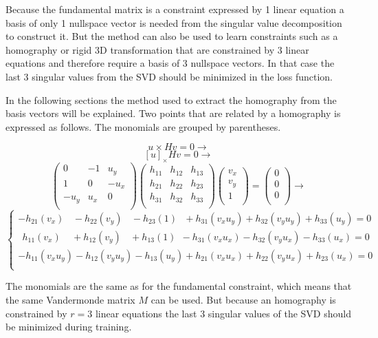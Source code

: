 Because the fundamental matrix is a constraint expressed by 1 linear equation a basis of only 1  nullspace vector is needed from the singular value decomposition to construct it. But the method can also be used to learn constraints such as a homography or rigid 3D transformation that are constrained by 3 linear equations and therefore require a basis of 3 nullspace vectors. In that case the last 3 singular values from the SVD should be minimized in the loss function.

In the following sections the method used to extract the homography from the basis vectors will be explained. Two points that are related by a homography is expressed as follows. The monomials are grouped by parentheses.

\[
u \times Hv=0 \rightarrow
\]
\[
[u]_{\times} Hv=0 \rightarrow
\]
\[
\begin{pmatrix}
0 & -1 & u_y \\
1 & 0 & -u_x \\
-u_y & u_x & 0 \\
\end{pmatrix}
\begin{pmatrix}
h_{11} & h_{12} & h_{13} \\
h_{21} & h_{22} & h_{23} \\
h_{31} & h_{32} & h_{33} \\
\end{pmatrix}
\begin{pmatrix}
v_x \\
v_y \\
1 \\
\end{pmatrix}
=
\begin{pmatrix}
0 \\
0 \\
0 \\
\end{pmatrix}
\rightarrow
\]
\[
\begin{cases}
-h_{21} (v_x) \ \ \ \ - h_{22} (v_y) \ \ \ \ - h_{23} (1) \ \ \ + h_{31} (v_x u_y) + h_{32} (v_y u_y) + h_{33} (u_y) = 0 \\
\ \ h_{11} (v_x) \ \ \ \ \ + h_{12} (v_y) \ \ \ \ + h_{13} (1) \ \ -h_{31} (v_x u_x) -h_{32} (v_y u_x) - h_{33} (u_x) = 0 \\
-h_{11} (v_x u_y) -h_{12} (v_y u_y) -h_{13} (u_y) + h_{21} (v_x u_x) + h_{22} (v_y u_x) + h_{23} (u_x) = 0 \\
\end{cases}
\]

The monomials are the same as for the fundamental constraint, which means that the same Vandermonde matrix $M$ can be used. But because an homography is constrained by $r=3$ linear equations the last 3 singular values of the SVD should be minimized during training.


